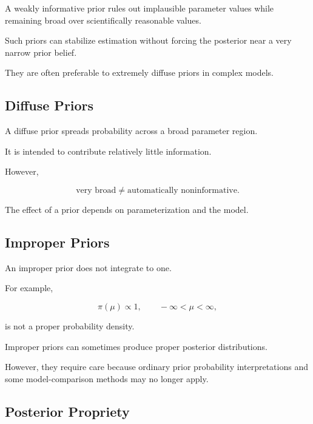 A weakly informative prior rules out implausible parameter values while
remaining broad over scientifically reasonable values.

Such priors can stabilize estimation without forcing the posterior near a
very narrow prior belief.

They are often preferable to extremely diffuse priors in complex models.

\subsection{Diffuse Priors}
\label{subsec:diffuse-priors}

A diffuse prior spreads probability across a broad parameter region.

It is intended to contribute relatively little information.

However,

\[
\boxed{
\text{very broad}
\neq
\text{automatically noninformative}.
}
\]

The effect of a prior depends on parameterization and the model.

\subsection{Improper Priors}
\label{subsec:improper-priors}

An improper prior does not integrate to one.

For example,

\[
\boxed{
\pi(\mu)\propto1,
\qquad
-\infty<\mu<\infty,
}
\]

is not a proper probability density.

Improper priors can sometimes produce proper posterior distributions.

However, they require care because ordinary prior probability
interpretations and some model-comparison methods may no longer apply.

\subsection{Posterior Propriety}
\label{subsec:posterior-propriety}

